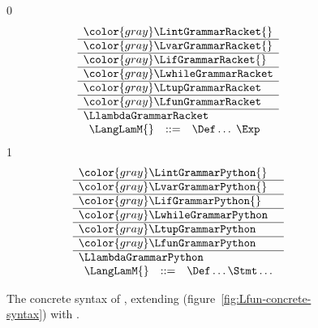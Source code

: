 \documentclass[7x10]{TimesAPriori_MIT}%
\newcommand{\gray}[1]{{\color{gray} #1}}
\def\racketEd{0}
\def\pythonEd{1}
\providecommand{\BookEdition}{1}
\let\edition\BookEdition
\newcommand{\pythonColor}[0]{}
\numberwithin{theorem}{chapter}
\numberwithin{definition}{chapter}
\numberwithin{equation}{chapter}
\begin{document}

\begin{figure}[tp]
\centering
\begin{tcolorbox}[colback=white]
    \small
{\if\edition\racketEd
\[
\begin{array}{l}
  \gray{\LintGrammarRacket{}} \\ \hline
  \gray{\LvarGrammarRacket{}} \\ \hline
  \gray{\LifGrammarRacket{}} \\ \hline
  \gray{\LwhileGrammarRacket} \\ \hline
  \gray{\LtupGrammarRacket} \\   \hline
  \gray{\LfunGrammarRacket} \\   \hline
  \LlambdaGrammarRacket \\
  \begin{array}{lcl}
  \LangLamM{} &::=& \Def\ldots \; \Exp
  \end{array}
\end{array}
\]
\fi}
{\if\edition\pythonEd\pythonColor
\[
\begin{array}{l}
  \gray{\LintGrammarPython{}} \\ \hline
  \gray{\LvarGrammarPython{}} \\ \hline
  \gray{\LifGrammarPython{}} \\ \hline
  \gray{\LwhileGrammarPython} \\ \hline
  \gray{\LtupGrammarPython} \\   \hline
  \gray{\LfunGrammarPython} \\   \hline
  \LlambdaGrammarPython \\
  \begin{array}{lcl}
    \LangLamM{} &::=& \Def\ldots \Stmt\ldots
  \end{array}
\end{array}
\]
\fi}
\end{tcolorbox}
\caption{The concrete syntax of \LangLam{}, extending \LangFun{} (figure~\ref{fig:Lfun-concrete-syntax}) 
  with .}
\label{fig:Llam-concrete-syntax}
\end{figure}
\end{document}
